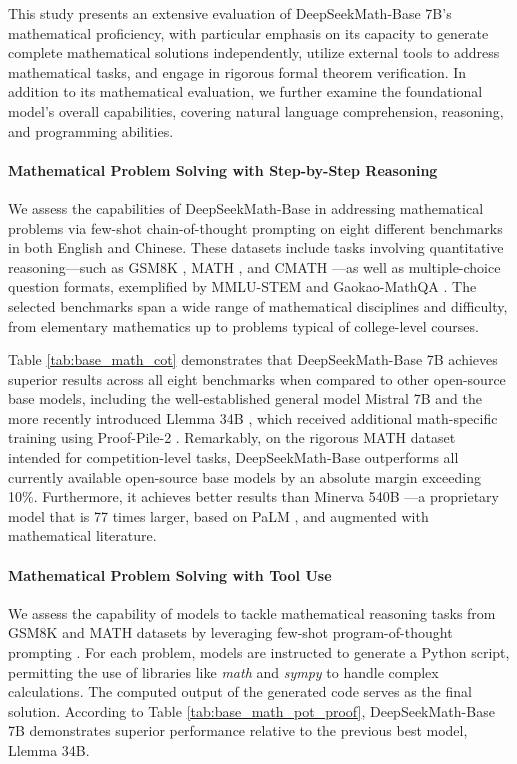 \begin{itemize}[topsep=0pt]
This study presents an extensive evaluation of DeepSeekMath-Base 7B’s mathematical proficiency, with particular emphasis on its capacity to generate complete mathematical solutions independently, utilize external tools to address mathematical tasks, and engage in rigorous formal theorem verification. In addition to its mathematical evaluation, we further examine the foundational model’s overall capabilities, covering natural language comprehension, reasoning, and programming abilities.

\paragraph{Mathematical Problem Solving with Step-by-Step Reasoning}

We assess the capabilities of DeepSeekMath-Base in addressing mathematical problems via few-shot chain-of-thought prompting \citep{cot} on eight different benchmarks in both English and Chinese. These datasets include tasks involving quantitative reasoning—such as GSM8K \citep{gsm8k}, MATH \citep{MATH}, and CMATH \citep{wei2023cmath}—as well as multiple-choice question formats, exemplified by MMLU-STEM \citep{mmlu} and Gaokao-MathQA \citep{agieval}. The selected benchmarks span a wide range of mathematical disciplines and difficulty, from elementary mathematics up to problems typical of college-level courses.

Table \ref{tab:base_math_cot} demonstrates that DeepSeekMath-Base 7B achieves superior results across all eight benchmarks when compared to other open-source base models, including the well-established general model Mistral 7B \citep{mistral} and the more recently introduced Llemma 34B \citep{llemma}, which received additional math-specific training using Proof-Pile-2 \citep{llemma}. Remarkably, on the rigorous MATH dataset intended for competition-level tasks, DeepSeekMath-Base outperforms all currently available open-source base models by an absolute margin exceeding 10\%. Furthermore, it achieves better results than Minerva 540B \citep{minerva}—a proprietary model that is 77 times larger, based on PaLM \citep{palm}, and augmented with mathematical literature.

\paragraph{Mathematical Problem Solving with Tool Use} We assess the capability of models to tackle mathematical reasoning tasks from GSM8K and MATH datasets by leveraging few-shot program-of-thought prompting \citep{pot,pal}. For each problem, models are instructed to generate a Python script, permitting the use of libraries like \textit{math} and \textit{sympy} to handle complex calculations. The computed output of the generated code serves as the final solution. According to Table \ref{tab:base_math_pot_proof}, DeepSeekMath-Base 7B demonstrates superior performance relative to the previous best model, Llemma 34B.


\end{itemize}

